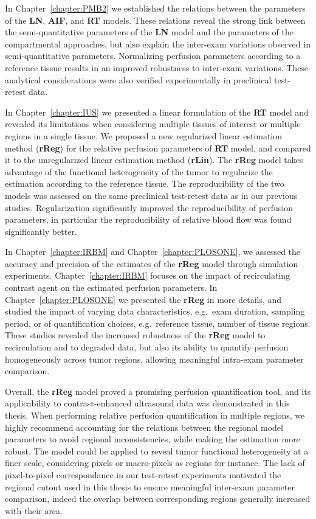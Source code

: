 In Chapter~\ref{chapter:PMB2} we established the relations between the parameters of the \textbf{LN}, \textbf{AIF}, and \textbf{RT} models.
These relations reveal the strong link between the semi-quantitative parameters of the \textbf{LN} model and the parameters of the compartmental approaches, but also explain the inter-exam variations observed in semi-quantitative parameters.
Normalizing perfusion parameters according to a reference tissue results in an improved robustness to inter-exam variations.
These analytical considerations were also verified experimentally in preclinical test-retest data.

In Chapter~\ref{chapter:IUS} we presented a linear formulation of the \textbf{RT} model and revealed its limitations when considering multiple tissues of interest or multiple regions in a single tissue. 
We proposed a new regularized linear estimation method (\textbf{rReg}) for the relative perfusion parameters of \textbf{RT} model, and compared it to the unregularized linear estimation method (\textbf{rLin}).
The \textbf{rReg} model takes advantage of the functional heterogeneity of the tumor to regularize the estimation according to the reference tissue.
The reproducibility of the two models was assessed on the same preclinical test-retest data as in our previous studies.
Regularization significantly improved the reproducibility of perfusion parameters, in particular the reproducibility of relative blood flow was found significantly better.

In Chapter~\ref{chapter:IRBM} and Chapter~\ref{chapter:PLOSONE}, we assessed the accuracy and precision of the estimates of the \textbf{rReg} model through simulation experiments.
Chapter~\ref{chapter:IRBM} focuses on the impact of recirculating contrast agent on the estimated perfusion parameters.
In Chapter~\ref{chapter:PLOSONE} we presented the \textbf{rReg} in more details, and studied the impact of varying data characteristics, e.g.~exam duration, sampling period, or of quantification choices, e.g.~reference tissue, number of tissue regions.
These studies revealed the increased robustness of the \textbf{rReg} model to recirculation and to degraded data, but also its ability to quantify perfusion homogeneously across tumor regions, allowing meaningful intra-exam parameter comparison.

Overall, the \textbf{rReg} model proved a promising perfusion quantification tool, and its applicability to contrast-enhanced ultrasound data was demonstrated in this thesis.
When performing relative perfusion quantification in multiple regions, we highly recommend accounting for the relations between the regional model parameters to avoid regional inconsistencies, while making the estimation more robust.
The model could be applied to reveal tumor functional heterogeneity at a finer scale, considering pixels or macro-pixels as regions for instance.
The lack of pixel-to-pixel correspondance in our test-retest experiments motivated the regional cutout used in this thesis to ensure meaningful inter-exam parameter comparison, indeed the overlap between corresponding regions generally increased with their area.

